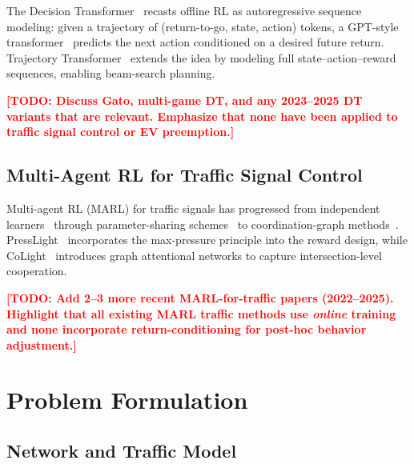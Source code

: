 \documentclass[journal]{IEEEtran}
\newcommand{\todo}[1]{\textcolor{red}{\textbf{[TODO: #1]}}}
\begin{document}
The Decision Transformer~\cite{chen2021decision} recasts offline RL as
autoregressive sequence modeling: given a trajectory of
(return-to-go, state, action) tokens, a GPT-style
transformer~\cite{vaswani2017attention} predicts the next action
conditioned on a desired future return.  Trajectory
Transformer~\cite{janner2021offline} extends the idea by modeling full
state--action--reward sequences, enabling beam-search planning.

\todo{Discuss Gato, multi-game DT, and any 2023--2025 DT variants
that are relevant.  Emphasize that none have been applied to traffic
signal control or EV preemption.}

\subsection{Multi-Agent RL for Traffic Signal Control}
\label{sec:related:marl}

Multi-agent RL (MARL) for traffic signals has progressed from
independent learners~\cite{chu2019multi} through parameter-sharing
schemes~\cite{chen2020toward} to coordination-graph
methods~\cite{wei2019colight}.  PressLight~\cite{wei2019presslight}
incorporates the max-pressure principle into the reward design, while
CoLight~\cite{wei2019colight} introduces graph attentional networks to
capture intersection-level cooperation.

\todo{Add 2--3 more recent MARL-for-traffic papers (2022--2025).
Highlight that all existing MARL traffic methods use \emph{online}
training and none incorporate return-conditioning for post-hoc
behavior adjustment.}

\section{Problem Formulation}
\label{sec:formulation}

\subsection{Network and Traffic Model}
\label{sec:formulation:network}
\end{document}
